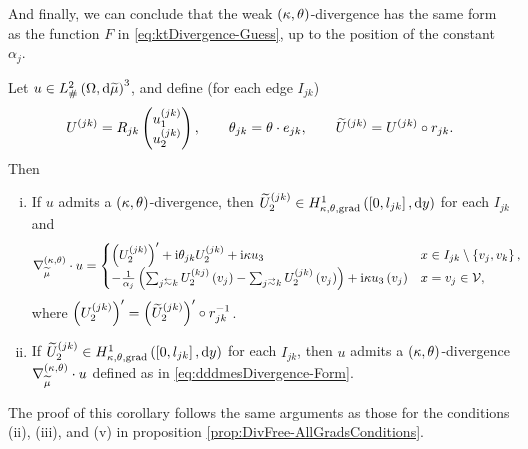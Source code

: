 And finally, we can conclude that the weak $\left( \kappa, \theta \right)$-divergence has the same form as the function $F$ in \eqref{eq:ktDivergence-Guess}, up to the position of the constant $\alpha_j$.
\begin{cory}
	Let $u\in L^2_{\#}\left( \Omega,\mathrm{d} \widetilde{\mu} \right)^3$, and define (for each edge $I_{jk}$)
	\begin{align*}
		U^{(jk)} = R_{jk}\begin{pmatrix} u_1^{(jk)} \\ u_2^{(jk)} \end{pmatrix}, 
		\qquad \theta_{jk} = \theta\cdot e_{jk}, 
		\qquad \widetilde{U}^{(jk)} = U^{(jk)}\circ r_{jk}.
	\end{align*}	
	Then
	\begin{enumerate}[(i)]
		\item If $u$ admits a $\left( \kappa, \theta \right)$-divergence, then $\widetilde{U}_2^{(jk)}\in H^1_{\kappa,\theta,\mathrm{grad}}\left( \left[ 0,l_{jk} \right], \mathrm{d}y \right)$ for each $I_{jk}$ and 
		\begin{align} \label{eq:dddmesDivergence-Form}
			\ktgrad_{\dddmes}\cdot u &= 
			\begin{cases} 
				\bracs{U_2^{(jk)}}' + \rmi\qm_{jk}U_2^{(jk)} + \rmi\wavenumber u_3 &
				x\in I_{jk}\setminus\clbracs{v_j,v_k}, \\
				-\recip{\alpha_j}\bracs{\sum_{j\conRight k}U_2^{(kj)}\bracs{v_j} - \sum_{j\conLeft k}U_2^{(jk)}\bracs{v_j}} + \rmi\wavenumber u_3\bracs{v_j} &
				x=v_j\in\vertSet,
			\end{cases}
		\end{align}
		where $\left( U_2^{(jk)} \right)' = \left( \widetilde{U}_2^{(jk)} \right)'\circ r_{jk}^{-1}$.
		\item If $\widetilde{U}_2^{(jk)}\in H^1_{\kappa,\theta,\mathrm{grad}}\left( \left[ 0,l_{jk} \right], \mathrm{d}y \right)$ for each $I_{jk}$, then $u$ admits a $\left( \kappa, \theta \right)$-divergence $\nabla^{\left( \kappa, \theta \right)}_{\widetilde{\mu}}\cdot u$ defined as in \eqref{eq:dddmesDivergence-Form}.
	\end{enumerate}
\end{cory}
The proof of this corollary follows the same arguments as those for the conditions (ii), (iii), and (v) in proposition \ref{prop:DivFree-AllGradsConditions}.

